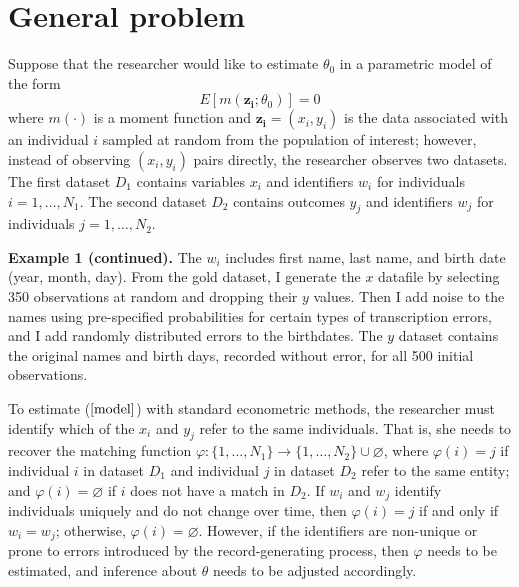 \documentclass[12pt]{article}
\begin{document}
\section{General problem}
Suppose that the researcher would like to estimate $\theta_0$ in a parametric model of the form
\begin{equation} E[m(\mathbf{z_i}; \theta_0)] = 0 \label{model} \end{equation}
where $m(\cdot)$ is a moment function and $\mathbf{z_i} = (x_i, y_i)$ is the data associated with an individual $i$ sampled at random from the population of interest; however, instead of observing $(x_i, y_i)$ pairs directly, the researcher observes two datasets.  The first dataset $D_1$ contains variables $x_i$ and identifiers $w_i$ for individuals $i = 1, \dots, N_1$.  The second dataset $D_2$ contains outcomes $y_j$ and identifiers $w_j$ for individuals $j=1,\dots, N_2$.

\textbf{Example 1 (continued).}  The $w_i$ includes first name, last name, and birth date (year, month, day).  From the gold dataset, I generate the $x$ datafile by selecting 350 observations at random and dropping their $y$ values.  Then I add noise to the names using pre-specified probabilities for certain types of transcription errors, and I add randomly distributed errors to the birthdates.   The $y$ dataset contains the original names and birth days, recorded without error, for all 500 initial observations.  


To estimate ($\ref{model}$) with standard econometric methods, the researcher must identify which of the $x_i$ and $y_j$ refer to the same individuals.   That is, she needs to recover the matching function $\varphi: \{1,\dots, N_1\} \to \{1,\dots, N_2\} \cup \varnothing$, where $\varphi(i) = j$ if individual $i$ in dataset $D_1$ and individual $j$ in dataset $D_2$ refer to the same entity; and $\varphi(i) = \varnothing$ if $i$ does not have a match in $D_2$.  If $w_i$ and $w_j$ identify individuals uniquely and do not change over time, then $\varphi(i) = j$ if and only if $w_i = w_j$; otherwise, $\varphi(i) = \varnothing$.  However, if the identifiers are non-unique or prone to errors introduced by the record-generating process, then $\varphi$ needs to be estimated, and inference about $\theta$ needs to be adjusted accordingly.   
\end{document}
